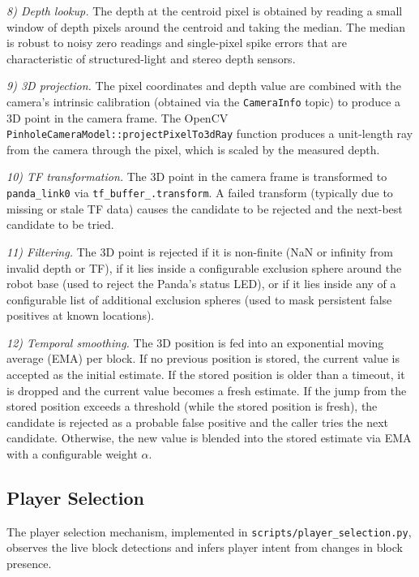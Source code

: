 \documentclass[conference]{IEEEtran}
\begin{document}
\textit{8) Depth lookup.} The depth at the centroid pixel is obtained
by reading a small window of depth pixels around the centroid and
taking the median. The median is robust to noisy zero readings and
single-pixel spike errors that are characteristic of structured-light
and stereo depth sensors.

\textit{9) 3D projection.} The pixel coordinates and depth value are
combined with the camera's intrinsic calibration (obtained via the
\texttt{CameraInfo} topic) to produce a 3D point in the camera frame.
The OpenCV \texttt{PinholeCameraModel::projectPixelTo3dRay} function
produces a unit-length ray from the camera through the pixel, which
is scaled by the measured depth.

\textit{10) TF transformation.} The 3D point in the camera frame is
transformed to \texttt{panda\_link0} via \texttt{tf\_buffer\_.transform}.
A failed transform (typically due to missing or stale TF data) causes
the candidate to be rejected and the next-best candidate to be tried.

\textit{11) Filtering.} The 3D point is rejected if it is non-finite
(NaN or infinity from invalid depth or TF), if it lies inside a
configurable exclusion sphere around the robot base (used to reject
the Panda's status LED), or if it lies inside any of a configurable
list of additional exclusion spheres (used to mask persistent false
positives at known locations).

\textit{12) Temporal smoothing.} The 3D position is fed into an
exponential moving average (EMA) per block. If no previous position
is stored, the current value is accepted as the initial estimate. If
the stored position is older than a timeout, it is dropped and the
current value becomes a fresh estimate. If the jump from the stored
position exceeds a threshold (while the stored position is fresh), the
candidate is rejected as a probable false positive and the caller
tries the next candidate. Otherwise, the new value is blended into the
stored estimate via EMA with a configurable weight $\alpha$.

\subsection{Player Selection}
\label{sec:selection}

The player selection mechanism, implemented in
\texttt{scripts/player\_selection.py}, observes the live block
detections and infers player intent from changes in block presence.
\end{document}
